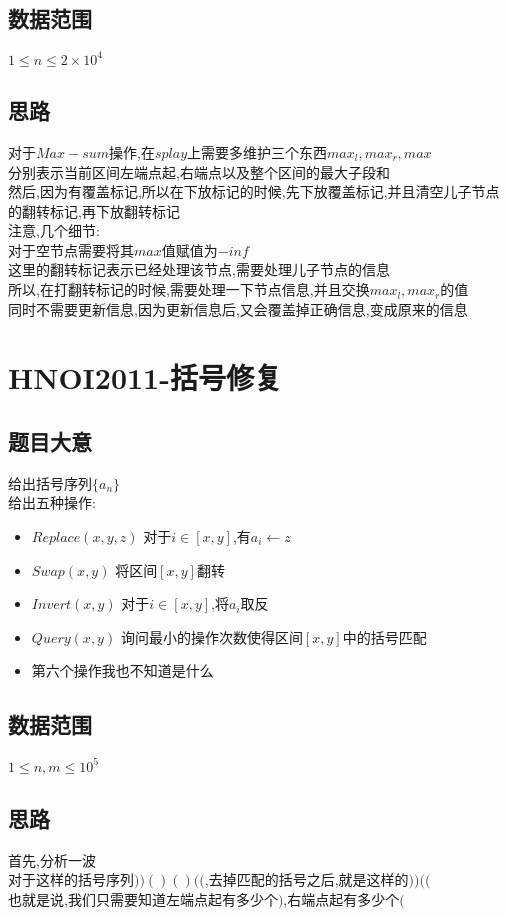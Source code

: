 \documentclass{ctexart}
\numberwithin{equation}{section}
\begin{document}
\begin{flushleft}
  \subsection{数据范围}
  $1\le n \le 2\times 10^4$
  \subsection{思路}
  对于$Max-sum$操作,在$splay$上需要多维护三个东西$max_l, max_r, max$\\
  分别表示当前区间左端点起,右端点以及整个区间的最大子段和\\
  然后,因为有覆盖标记,所以在下放标记的时候,先下放覆盖标记,并且清空儿子节点的翻转标记,再下放翻转标记\\
  注意,几个细节:\\

  对于空节点需要将其$max$值赋值为$-inf$\\
  这里的翻转标记表示已经处理该节点,需要处理儿子节点的信息\\
  所以,在打翻转标记的时候,需要处理一下节点信息,并且交换$max_l,max_r$的值\\
  同时不需要更新信息,因为更新信息后,又会覆盖掉正确信息,变成原来的信息\\
  \newpage

  \section{HNOI2011-括号修复}
  \subsection{题目大意}
  给出括号序列$\{a_n\}$\\
  给出五种操作:\\
  \begin{itemize}
  \item $Replace(x,y,z)$ 对于$i\in [x,y]$,有$a_i\leftarrow z$
  \item $Swap(x,y)$ 将区间$[x,y]$翻转
  \item $Invert(x,y)$ 对于$i\in [x,y]$,将$a_i$取反
  \item $Query(x,y)$ 询问最小的操作次数使得区间$[x,y]$中的括号匹配
  \item 第六个操作我也不知道是什么
  \end{itemize}
  \subsection{数据范围}
  $1\le n,m \le 10^5$
  \subsection{思路}
  首先,分析一波\\
  对于这样的括号序列$))()()(($,去掉匹配的括号之后,就是这样的$))(($\\
  也就是说,我们只需要知道左端点起有多少个$)$,右端点起有多少个$($\\


\end{flushleft}
\end{document}
